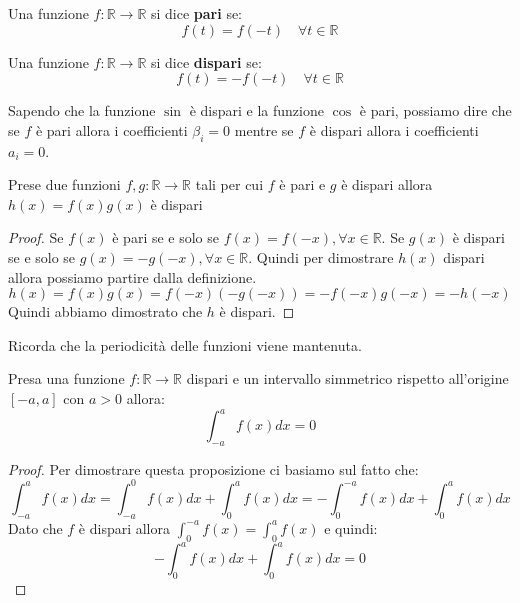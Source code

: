 \begin{definizione}
    Una funzione $f:\mathbb{R}\to \mathbb{R}$ si dice \textbf{pari} se:
    \begin{equation}
        f(t) = f(-t) \quad \forall t \in \mathbb{R}
    \end{equation}
\end{definizione}
\begin{definizione}
    Una funzione $f:\mathbb{R}\to \mathbb{R}$ si dice \textbf{dispari} se:
    \begin{equation}
        f(t) = -f(-t) \quad \forall t \in \mathbb{R}
    \end{equation}
\end{definizione}
Sapendo che la funzione $\sin$ è dispari e la funzione $\cos$ è pari, possiamo
dire che se $f$ è pari allora i coefficienti $\beta_i = 0$ mentre se $f$ è dispari
allora i coefficienti $a_i = 0$.
\begin{proposizione}
    Prese due funzioni $f,g:\mathbb{R}\to \mathbb{R}$ tali per cui $f$ è pari e
    $g$ è dispari allora $h(x)=f(x)g(x)$ è dispari
    \begin{proof}
        Se $f(x)$ è pari se e solo se $f(x) = f(-x),\forall x\in \mathbb{R}$.
        Se $g(x)$ è dispari se e solo se $g(x) = -g(-x),\forall x\in \mathbb{R}$.
        Quindi per dimostrare $h(x)$ dispari allora possiamo partire dalla definizione.
        \begin{equation*}
            h(x) = f(x)g(x) = f(-x) (-g(-x)) = - f(-x)g(-x) = -h(-x)
        \end{equation*}
        Quindi abbiamo dimostrato che $h$ è dispari.
    \end{proof}
\end{proposizione}
Ricorda che la periodicità delle funzioni viene mantenuta.
\begin{proposizione}
    Presa una funzione $f:\mathbb{R}\to \mathbb{R}$ dispari e un intervallo simmetrico
    rispetto all'origine $[-a,a]$ con $a>0$ allora:
    \begin{equation}
        \int_{-a}^{a} f(x)dx = 0
    \end{equation}
    \begin{proof}
        Per dimostrare questa proposizione ci basiamo sul fatto che:
        \begin{equation*}
            \int_{-a}^{a} f(x)dx = \int_{-a}^{0} f(x)dx + \int_{0}^{a} f(x)dx =
            -\int_{0}^{-a} f(x) dx+ \int_{0}^{a} f(x)dx
        \end{equation*}
        Dato che $f$ è dispari allora $ \int_{0}^{-a} f(x) = \int_{0}^{a} f(x)$
        e quindi:
        \begin{equation*}
            -\int_{0}^{a} f(x) dx + \int_{0}^{a} f(x) dx = 0
        \end{equation*}
    \end{proof}
\end{proposizione}
